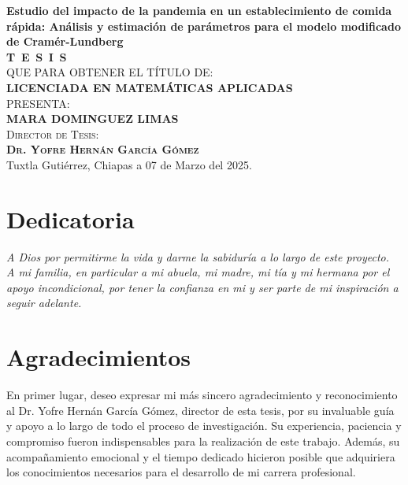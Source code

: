 \documentclass[
  us-letterpaper,
]{scrreprt}
\theoremstyle{plain}
\theoremstyle{plain}
\theoremstyle{definition}
\theoremstyle{remark}
\begin{document}
\begin{titlepage}
\begin{minipage}[t][0.95\textheight][c]{0.76\textwidth}
            \begin{center}
                {\Large\bfseries Estudio del impacto de la pandemia en un establecimiento de comida rápida: Análisis y estimación de parámetros para el modelo modificado de Cramér-Lundberg}\\[2cm]
                \textsc{\huge \textbf{T\, E\, S\, I\, S}}\\[1.5cm]
                \textsc{\large QUE PARA OBTENER EL TÍTULO DE:}\\[0.3cm]
                \textbf{\textsc{LICENCIADA EN MATEMÁTICAS APLICADAS}}\\[1.5cm]
                \textsc{\large PRESENTA:}\\[0.3cm]
                \textbf{\textsc{\large {MARA DOMINGUEZ LIMAS}}}\\[2cm]
                {\large\scshape Director de Tesis:\\[0.3cm]
                {\textbf{\large Dr. Yofre Hernán García Gómez }}}\\[2.0cm]
                \large{Tuxtla Gutiérrez, Chiapas a 07 de Marzo del 2025.}

            \end{center}
\end{minipage}
\end{titlepage}

\pagebreak[2]

\chapter*{Dedicatoria}
\begin{flushright}
\textit{A Dios por permitirme la vida y darme la sabiduría a lo largo de este proyecto. \\
 A mi familia, en particular a mi abuela, mi madre, mi tía y mi hermana por el apoyo incondicional, por tener la confianza en mi y ser parte de mi inspiración a seguir adelante.}
 \end{flushright}

\chapter*{Agradecimientos}

En primer lugar, deseo expresar mi más sincero agradecimiento y reconocimiento al Dr. Yofre Hernán García Gómez, director de esta tesis, por su invaluable guía y apoyo a lo largo de todo el proceso de investigación. Su experiencia, paciencia y compromiso fueron indispensables para la realización de este trabajo. Además, su acompañamiento emocional y el tiempo dedicado hicieron posible que adquiriera los conocimientos necesarios para el desarrollo de mi carrera profesional.
\end{document}
